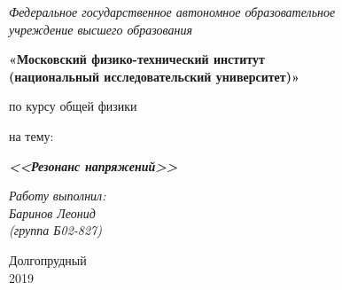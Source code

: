 \thispagestyle{empty}
\begin{center}
    \textit{Федеральное государственное автономное образовательное\\ учреждение высшего образования }

    \vspace{0.5ex}

        \textbf{«Московский физико-технический институт\\ (национальный исследовательский университет)»}
\end{center}

\vspace{10ex}

\begin{center}
    \vspace{13ex}


    \vspace{1ex}

    по курсу общей физики

    на тему:

    \textbf{\textit{<<Резонанс
    напряжений>>}}

    \vspace{30ex}

    \begin{flushright}
        \noindent
        \textit{Работу выполнил:}\\  
        \textit{Баринов Леонид \\(группа Б02-827)}
    \end{flushright}
    \vfill
    Долгопрудный \\2019
\newpage
\setcounter{page}{1}
\fancyhead[R]{\nouppercase{\leftmark}}	
\end{center}
